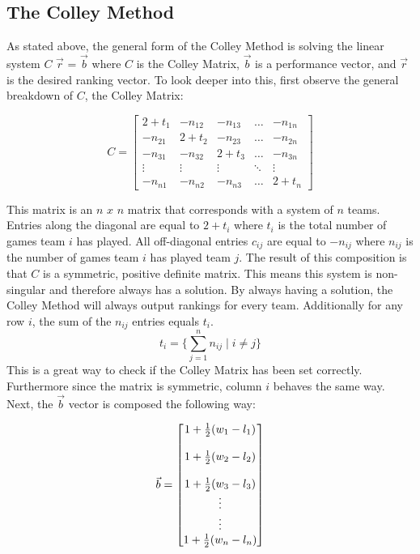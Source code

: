 \documentclass{article}
\begin{document}
\subsection{The Colley Method}
As stated above, the general form of the Colley Method is solving the linear system $C$ $\vec{r}$ = $\vec{b}$ where $C$ is the Colley Matrix, $\vec{b}$ is a performance vector, and $\vec{r}$ is the desired ranking vector. To look deeper into this, first observe the general breakdown of $C$, the Colley Matrix:
\begin{center}
\[
C =
\begin{bmatrix}
2+t_1 & -n_{12} & -n_{13} & \hdots & -n_{1n}\\
-n_{21} & 2+t_2 & -n_{23} & \hdots & -n_{2n}\\
-n_{31} & -n_{32} & 2+t_3 & \hdots & -n_{3n}\\
\vdots & \vdots & \vdots & \ddots & \vdots\\
-n_{n1} & -n_{n2} & -n_{n3}& \hdots & 2+t_n
\end{bmatrix}
\]
\end{center}

This matrix is an $n$ $x$ $n$ matrix that corresponds with a system of $n$ teams. Entries along the diagonal are equal to $2 + t_i$ where $t_i$ is the total number of games team $i$ has played. All off-diagonal entries $c_{ij}$ are equal to $-n_{ij}$ where $n_{ij}$ is the number of games team $i$ has played team $j$. The result of this composition is that $C$ is a symmetric, positive definite matrix. This means this system is non-singular and therefore always has a solution. By always having a solution, the Colley Method will always output rankings for every team. Additionally for any row $i$,
the sum of the $n_{ij}$ entries equals $t_i$.
\begin{equation}
t_i = \Big\{\sum_{j=1}^{n} n_{ij} \mid i \neq j\Big\}
\end{equation}
This is a great way to check if the Colley Matrix has been set correctly. Furthermore since the matrix is symmetric, column $i$ behaves the same way. Next, the $\vec{b}$ vector is composed the following way:
\begin{center}
\[
\vec{b} =
\begin{bmatrix}
1 + \frac{1}{2}(w_1 - l_1)\\
\space\\
1 + \frac{1}{2}(w_2 - l_2)\\
\space\\
1 + \frac{1}{2}(w_3 - l_3)\\
\vdots\\
\vdots\\
1 + \frac{1}{2}(w_n - l_n)\\
\end{bmatrix}
\]
\end{center}
\end{document}
